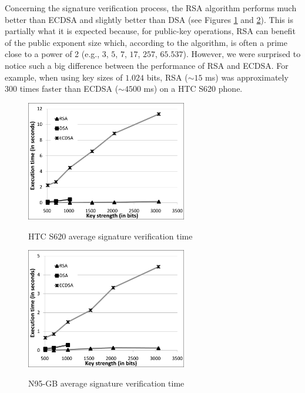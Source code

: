 \documentclass[authoryear]{elsarticle}
\begin{document}

Concerning the signature verification process, the RSA algorithm performs much better than ECDSA and slightly better than DSA (see Figures \ref{fig:HTCVerify} and \ref{fig:N95Verify}). This is partially what it is expected because, for public-key operations, RSA can benefit of the public exponent size which, according to the algorithm, is often a prime close to a power of 2 (e.g., $3$, $5$, $7$, $17$, $257$, $65.537$). However, we were surprised to notice such a big difference between the performance of RSA and ECDSA. For example, when using key sizes of $1.024$ bits, RSA ($\sim15$ ms) was approximately $300$ times faster than ECDSA ($\sim4500$ ms) on a HTC S620 phone.

\begin{figure}[ht]
\begin{center}
  \includegraphics[width=7cm]{immagini/HTCVerify.pdf}\\
  \caption{HTC S620 average signature verification time}
  \label{fig:HTCVerify}
\end{center}
\end{figure}

\begin{figure}[ht]
\begin{center}
  \includegraphics[width=7cm]{immagini/N95Verify.pdf}\\
  \caption{N95-GB average signature verification time}
  \label{fig:N95Verify}
\end{center}
\end{figure}
\end{document}
